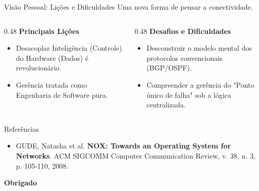\documentclass[aspectratio=169,xcolor=dvipsnames]{beamer}
\begin{document}
\begin{frame}{Visão Pessoal: Lições e Dificuldades}
    Uma nova forma de pensar a conectividade.
    
    \vspace{0.5cm}
    
    \begin{columns}[T]
        \begin{column}{0.48\textwidth}
            \textbf{Principais Lições}
            \begin{itemize}            
                \item Desacoplar Inteligência (Controle) do Hardware (Dados) é revolucionário.
                \item Gerência tratada como Engenharia de Software pura.
            \end{itemize}
        \end{column}
        \begin{column}{0.48\textwidth}
            \textbf{Desafios e Dificuldades}
            \begin{itemize}            
                \item Desconstruir o modelo mental dos protocolos convencionais (BGP/OSPF).
                \item Compreender a gerência do "Ponto único de falha" sob a lógica centralizada.
            \end{itemize}
        \end{column}
    \end{columns}
    
    \vspace{0.3cm}
\end{frame}


\begin{frame}{Referências}
    \begin{itemize}    
        \item GUDE, Natasha et al. \textbf{NOX: Towards an Operating System for Networks}. ACM SIGCOMM Computer Communication Review, v. 38, n. 3, p. 105-110, 2008.
    \end{itemize}
\end{frame}


\begin{frame}            
    \Huge{\centerline{\textbf{Obrigado}}}
\end{frame}
\end{document}

